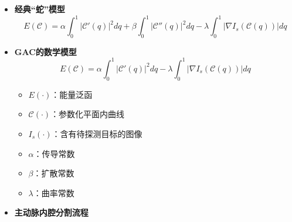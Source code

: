 \begin{frame}
\begin{itemize}
\item \textbf{经典“蛇”模型}
\begin{equation*}
E(\mathcal{C}) = \alpha \int_0^1 | \mathcal{C}'(q) |^2 dq + \beta \int_0^1 | \mathcal{C}''(q) |^2 dq - \lambda \int_0^1 | \nabla I_{s} ( \mathcal{C}(q) ) |dq
\end{equation*}
\pause \item \textbf{GAC的数学模型}
\begin{equation*}
E(\mathcal{C}) = \alpha \int_0^1 | \mathcal{C}'(q) |^2 dq - \lambda \int_0^1 | \nabla I_{s} ( \mathcal{C}(q) ) |dq
\end{equation*}
\begin{itemize}
\item $E(\cdot)$：能量泛函
\item $\mathcal{C}(\cdot)$：参数化平面内曲线
\item $I_{s}(\cdot)$：含有待探测目标的图像
\item $\alpha$：传导常数
\item $\beta$：扩散常数
\item $\lambda$：曲率常数
\end{itemize}
\end{itemize}
\end{frame}

\begin{frame}
\begin{itemize}
\item \textbf{主动脉内腔分割流程}
\end{itemize}
\begin{figure}[t]
\centering

\end{figure}
\end{frame}

